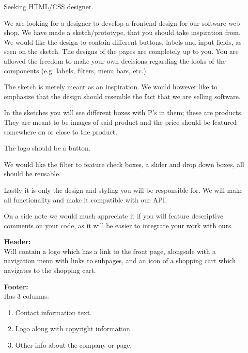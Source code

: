 \documentclass[11pt]{report}
\begin{document}
\noindent Seeking HTML/CSS designer.

\noindent We are looking for a designer to develop a frontend design for our software web-shop. We have made a sketch/prototype, that you should take inspiration from. We would like the design to contain different buttons, labels and input fields, as seen on the sketch. The designs of the pages are completely up to you. You are allowed the freedom to make your own decisions regarding the looks of the components (e.g. labels, filters, menu bars, etc.).

\noindent The sketch is merely meant as an inspiration. We would however like to emphasize that the design should resemble the fact that we are selling software.

\noindent In the sketches you will see different boxes with P’s in them; these are products. They are meant to be images of said product and the price should be featured somewhere on or close to the product.

\noindent The logo should be a button.

\noindent We would like the filter to feature check boxes, a slider and drop down boxes, all should be reusable.

\noindent Lastly it is only the design and styling you will be responsible for. We will make all functionality and make it compatible with our API.

\noindent On a side note we would much appreciate it if you will feature descriptive comments on your code, as it will be easier to integrate your work with ours.

\noindent \textbf{Header:}\\
\noindent Will contain a logo which has a link to the front page, alongside with a navigation menu with links to subpages, and an icon of a shopping cart which navigates to the shopping cart. 

\noindent \textbf{Footer:}\\
\noindent Has 3 columns:
\begin{enumerate}[topsep=0pt, partopsep=0pt]
  \item Contact information text.
  \item Logo along with copyright information.
  \item Other info about the company or page.
\end{enumerate}
\end{document}
